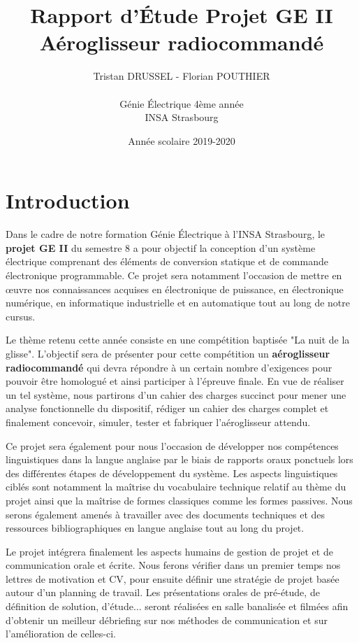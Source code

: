 \documentclass[a4paper,12pt]{book}
\title{Rapport d'Étude Projet GE II\\Aéroglisseur radiocommandé}
\author{Tristan DRUSSEL - Florian POUTHIER \\ \\ Génie Électrique 4ème année\\ INSA Strasbourg}
\date{Année scolaire 2019-2020}
\begin{document}
\begin{titlepage}		
	\maketitle
\end{titlepage}
	\tableofcontents
	\newpage
	
\chapter{Introduction}
	
	Dans le cadre de notre formation Génie Électrique à l'INSA Strasbourg, le \textbf{projet GE II} du semestre 8 a pour objectif la conception d'un système électrique comprenant des éléments de conversion statique et de commande électronique programmable. Ce projet sera notamment l'occasion de mettre en œuvre nos connaissances acquises en électronique de puissance, en électronique numérique, en informatique industrielle et en automatique tout au long de notre cursus. 
	
	Le thème retenu cette année consiste en une compétition baptisée "La nuit de la glisse". L'objectif sera de présenter pour cette compétition un \textbf{aéroglisseur radiocommandé} qui devra répondre à un certain nombre d'exigences pour pouvoir être homologué et ainsi participer à l'épreuve finale. En vue de réaliser un tel système, nous partirons d'un cahier des charges succinct pour mener une analyse fonctionnelle du dispositif, rédiger un cahier des charges complet et finalement concevoir, simuler, tester et fabriquer l'aéroglisseur attendu.
	
	Ce projet sera également pour nous l'occasion de développer nos compétences linguistiques dans la langue anglaise par le biais de rapports oraux ponctuels lors des différentes étapes de développement du système. Les aspects linguistiques ciblés sont notamment la maîtrise du vocabulaire technique relatif au thème du projet ainsi que la maîtrise de formes classiques comme les formes passives. Nous serons également amenés à travailler avec des documents techniques et des ressources bibliographiques en langue anglaise tout au long du projet.
	
	Le projet intégrera finalement les aspects humains de gestion de projet et de communication orale et écrite. Nous ferons vérifier dans un premier temps nos lettres de motivation et CV, pour ensuite définir une stratégie de projet basée autour d'un planning de travail. Les présentations orales de pré-étude, de définition de solution, d'étude... seront réalisées en salle banalisée et filmées afin d'obtenir un meilleur débriefing sur nos méthodes de communication et sur l'amélioration de celles-ci.
	
\end{document}
